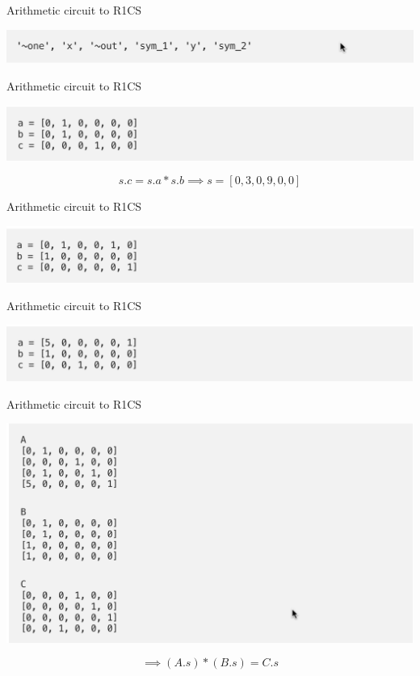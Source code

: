 \documentclass{beamer}
\begin{document}
\begin{frame}{Arithmetic circuit to R1CS}
	\begin{minipage}{0.42\linewidth}
		\includegraphics[scale=0.45]{a5.png}
	\end{minipage}
\end{frame}

\begin{frame}{Arithmetic circuit to R1CS}
	\begin{minipage}{0.42\linewidth}
		\includegraphics[scale=0.45]{a6.png}
	\end{minipage}
   $$s.c=s.a*s.b \implies s=[0,3,0,9,0,0]$$
\end{frame}


\begin{frame}{Arithmetic circuit to R1CS}
	\begin{minipage}{0.42\linewidth}
		\includegraphics[scale=0.45]{a7.png}
	\end{minipage}
\end{frame}

\begin{frame}{Arithmetic circuit to R1CS}
	\begin{minipage}{0.42\linewidth}
		\includegraphics[scale=0.45]{a8.png}
	\end{minipage}
\end{frame}

\begin{frame}{Arithmetic circuit to R1CS}
	\begin{minipage}{0.42\linewidth}
		\includegraphics[scale=0.40]{a9.png}
	\end{minipage}
$$\implies (A.s)*(B.s)=C.s$$
\end{frame}
\end{document}
